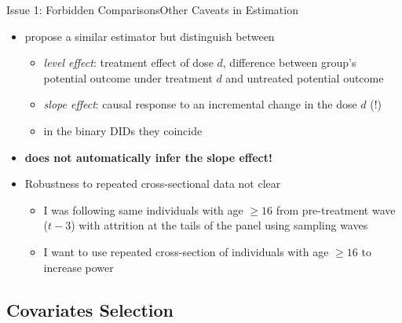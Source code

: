 \documentclass{beamer}
\begin{document}
\begin{frame}{Issue 1: Forbidden Comparisons}{Other Caveats in Estimation}
    
    \begin{itemize}
        \item \citet{bib:callaway2021} propose a similar estimator but distinguish between

        \begin{itemize}
            \item \textit{level effect}: treatment effect of dose $d$, difference between group's potential outcome under treatment $d$ and untreated potential outcome
            \item \textit{slope effect}: causal response to an incremental change in the dose $d$ \citep{bib:angrist1995} (!)
            \item in the binary DIDs they coincide
        \end{itemize}

        \item \textbf{\citet{bib:dechaisemartin2021} does not automatically infer the slope effect!}

    \end{itemize}

    \begin{itemize}
        \item Robustness to repeated cross-sectional data not clear

        \begin{itemize}
            \item I was following same individuals with age $\geq 16$ from pre-treatment wave ($t-3$) with attrition at the tails of the panel using sampling waves
            \item I want to use repeated cross-section of individuals with age $\geq 16$ to increase power
        \end{itemize}

    \end{itemize}

\end{frame}


\subsection{Covariates Selection}
\end{document}
